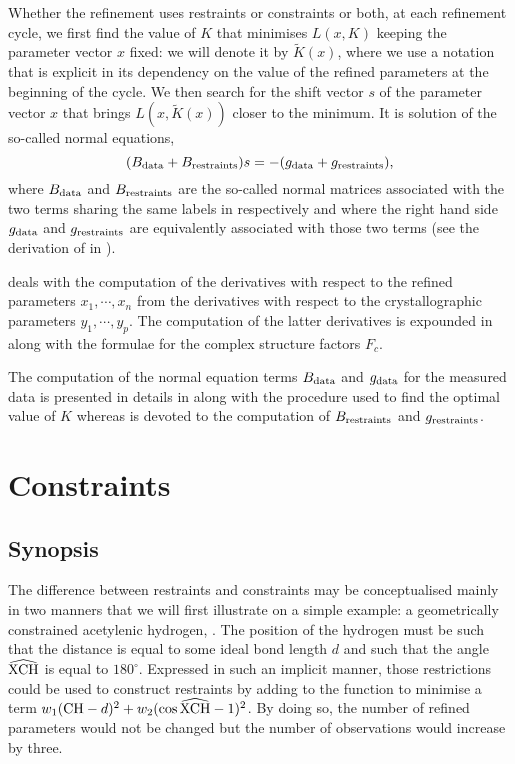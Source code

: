 \documentclass[pdf]{iucr}
\begin{document}
Whether the refinement uses restraints or constraints or both, at each refinement cycle, we first find the value of $K$ that minimises $L(x, K)$ keeping the parameter vector $x$ fixed: we will denote it by $\tilde{K}(x)$, where we use a notation that is explicit in its dependency on the value of the refined parameters at the beginning of the cycle. We then search for the shift vector $s$ of the parameter vector $x$ that brings $L(x, \tilde{K}(x))$ closer to the minimum. It is solution of the so-called normal equations,
\begin{equation}
(B_{\text{data}} + B_{\text{restraints}})s = -(g_{\text{data}} + g_{\text{restraints}}),
\label{eqn:generalnormalequations}
\end{equation}
where $B_{\text{data}}$ and $B_{\text{restraints}}$ are the so-called normal matrices associated with the two terms sharing the same labels in  respectively and where the right hand side $g_{\text{data}}$ and $g_{\text{restraints}}$ are equivalently associated with those two terms (see the derivation of  in ).

 deals with the computation of the derivatives with respect to the refined parameters $x_1, \cdots, x_n$ from the derivatives with respect to the crystallographic parameters $y_1, \cdots, y_p$. The computation of the latter derivatives is expounded in  along with the formulae for the complex structure factors $F_c$.

The computation of the normal equation terms $B_{\text{data}}$ and $g_{\text{data}}$ for the measured data is presented in details in  along with the procedure used to find the optimal value of $K$ whereas  is devoted to the computation of $B_{\text{restraints}}$ and $g_{\text{restraints}}$.

\section{Constraints}
\label{sec:constraints}

\subsection{Synopsis}

The difference between restraints and constraints may be conceptualised mainly in two manners that we will first illustrate on a simple example: a geometrically constrained acetylenic hydrogen, . The position of the hydrogen must be such that the distance  is equal to some ideal bond length $d$ and such that the angle $\widehat{\ce{XCH}}$ is equal to $180^\circ$. Expressed in such an implicit manner, those restrictions could be used to construct restraints by adding to the function to minimise a term $w_1 (\ce{CH} - d)^2 + w_2 (\cos \widehat{\ce{XCH}} - 1)^2$. By doing so, the number of refined parameters would not be changed but the number of observations would increase by three. 
\end{document}

